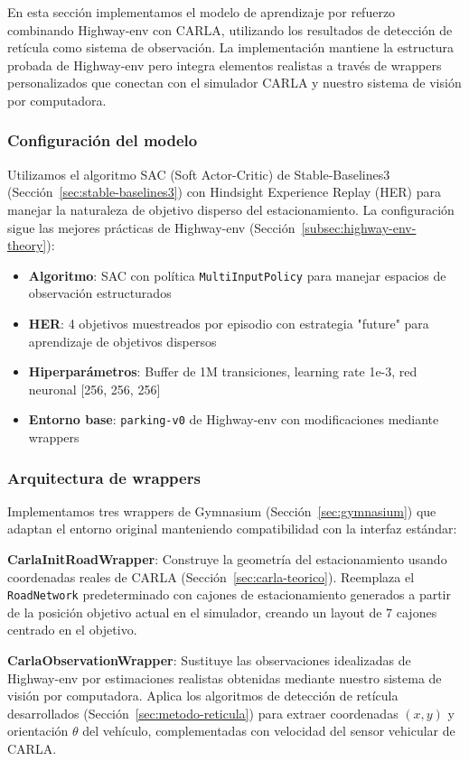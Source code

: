 \noindent
En esta sección implementamos el modelo de aprendizaje por refuerzo combinando Highway-env con CARLA,
utilizando los resultados de detección de retícula como sistema de observación. La implementación
mantiene la estructura probada de Highway-env pero integra elementos realistas a través de wrappers
personalizados que conectan con el simulador CARLA y nuestro sistema de visión por computadora.

\subsubsection{Configuración del modelo}
\noindent
Utilizamos el algoritmo SAC (Soft Actor-Critic) de Stable-Baselines3 (Sección~\ref{sec:stable-baselines3})
con Hindsight Experience Replay (HER) para manejar la naturaleza de objetivo disperso del estacionamiento.
La configuración sigue las mejores prácticas de Highway-env (Sección~\ref{subsec:highway-env-theory}):

\begin{itemize}
    \item \textbf{Algoritmo}: SAC con política \texttt{MultiInputPolicy} para manejar espacios de observación estructurados
    \item \textbf{HER}: 4 objetivos muestreados por episodio con estrategia "future" para aprendizaje de objetivos dispersos
    \item \textbf{Hiperparámetros}: Buffer de 1M transiciones, learning rate 1e-3, red neuronal [256, 256, 256]
    \item \textbf{Entorno base}: \texttt{parking-v0} de Highway-env con modificaciones mediante wrappers
\end{itemize}

\subsubsection{Arquitectura de wrappers}
\noindent
Implementamos tres wrappers de Gymnasium (Sección~\ref{sec:gymnasium}) que adaptan el entorno original
manteniendo compatibilidad con la interfaz estándar:

\noindent
\textbf{CarlaInitRoadWrapper}: Construye la geometría del estacionamiento usando coordenadas reales de CARLA
(Sección~\ref{sec:carla-teorico}). Reemplaza el \texttt{RoadNetwork} predeterminado con cajones de estacionamiento
generados a partir de la posición objetivo actual en el simulador, creando un layout de 7 cajones centrado
en el objetivo.

\noindent
\textbf{CarlaObservationWrapper}: Sustituye las observaciones idealizadas de Highway-env por estimaciones
realistas obtenidas mediante nuestro sistema de visión por computadora. Aplica los algoritmos de detección
de retícula desarrollados (Sección~\ref{sec:metodo-reticula}) para extraer coordenadas $(x,y)$ y orientación
$\theta$ del vehículo, complementadas con velocidad del sensor vehicular de CARLA.

